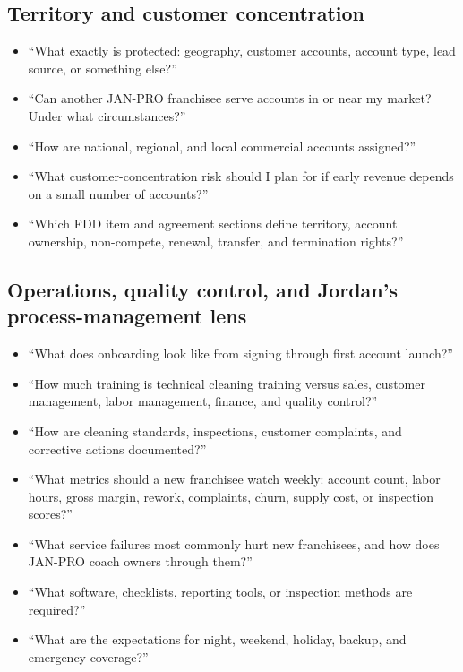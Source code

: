 \documentclass[11pt]{article}
\newcommand{\janpro}{JAN-PRO}
\begin{document}
\subsection{Territory and customer concentration}

\begin{itemize}
  \item ``What exactly is protected: geography, customer accounts, account type, lead source, or something else?''
  \item ``Can another \janpro{} franchisee serve accounts in or near my market? Under what circumstances?''
  \item ``How are national, regional, and local commercial accounts assigned?''
  \item ``What customer-concentration risk should I plan for if early revenue depends on a small number of accounts?''
  \item ``Which FDD item and agreement sections define territory, account ownership, non-compete, renewal, transfer, and termination rights?''
\end{itemize}

\subsection{Operations, quality control, and Jordan's process-management lens}

\begin{itemize}
  \item ``What does onboarding look like from signing through first account launch?''
  \item ``How much training is technical cleaning training versus sales, customer management, labor management, finance, and quality control?''
  \item ``How are cleaning standards, inspections, customer complaints, and corrective actions documented?''
  \item ``What metrics should a new franchisee watch weekly: account count, labor hours, gross margin, rework, complaints, churn, supply cost, or inspection scores?''
  \item ``What service failures most commonly hurt new franchisees, and how does \janpro{} coach owners through them?''
  \item ``What software, checklists, reporting tools, or inspection methods are required?''
  \item ``What are the expectations for night, weekend, holiday, backup, and emergency coverage?''
\end{itemize}
\end{document}
